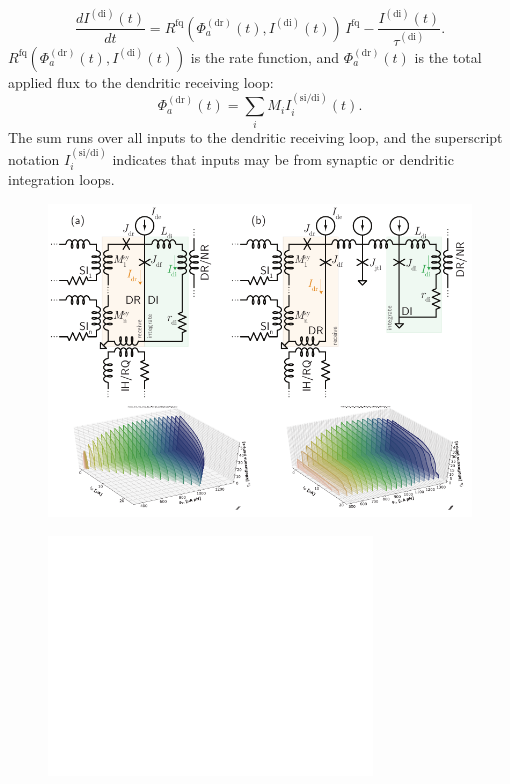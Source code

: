 \documentclass[twocolumn]{article}
\begin{document}
\begin{equation}
\label{eq:dendrites__leaky_integrator}
\frac{dI^{(\mathrm{di})}(t)}{dt} = R^{\mathrm{fq}} \left( \Phi^{(\mathrm{dr})}_a(t),I^{(\mathrm{di})}(t) \right)\,I^{\mathrm{fq}} - \frac{I^{(\mathrm{di})}(t)}{\tau^{(\mathrm{di})}}.
\end{equation}
$R^{\mathrm{fq}} \left( \Phi^{(\mathrm{dr})}_a(t),I^{(\mathrm{di})}(t) \right)$ is the rate function, and $\Phi^{(\mathrm{dr})}_a(t)$ is the total applied flux to the dendritic receiving loop:
\begin{equation}
\label{eq:dendrites__applied_flux}
\Phi^{(\mathrm{dr})}_a(t) = \sum_i M_i I_i^{(\mathrm{si/di})}(t).
\end{equation}
The sum runs over all inputs to the dendritic receiving loop, and the superscript notation $I_i^{(\mathrm{si/di})}$ indicates that inputs may be from synaptic or dendritic integration loops.

\begin{figure}[h!]
\includegraphics[width=17.2cm]{figures/_fig__dendrites__circuits_responses.pdf}
\end{figure}

\begin{figure}[h!]
\includegraphics[width=8.6cm]{figures/_fig__dendrites__comparison.pdf}
\end{figure}
\end{document}
